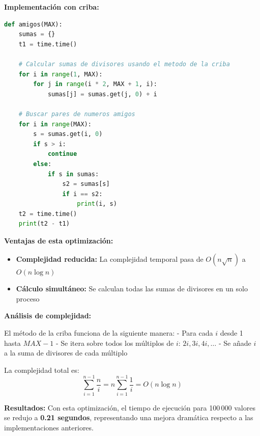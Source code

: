 \textbf{Implementación con criba:}

\begin{lstlisting}[language=Python]
def amigos(MAX):
    sumas = {}
    t1 = time.time()
    
    # Calcular sumas de divisores usando el metodo de la criba
    for i in range(1, MAX):
        for j in range(i * 2, MAX + 1, i):
            sumas[j] = sumas.get(j, 0) + i
    
    # Buscar pares de numeros amigos
    for i in range(MAX):
        s = sumas.get(i, 0)
        if s > i:
            continue
        else:
            if s in sumas:
                s2 = sumas[s]
                if i == s2:
                    print(i, s)       
    t2 = time.time()
    print(t2 - t1)
\end{lstlisting}

\textbf{Ventajas de esta optimización:}

\begin{itemize}
    \item \textbf{Complejidad reducida:} La complejidad temporal pasa de $O(n \sqrt{n})$ a $O(n \log n)$
    \item \textbf{Cálculo simultáneo:} Se calculan todas las sumas de divisores en un solo proceso
\end{itemize}

\textbf{Análisis de complejidad:}

El método de la criba funciona de la siguiente manera:
- Para cada $i$ desde 1 hasta $MAX-1$
- Se itera sobre todos los múltiplos de $i$: $2i, 3i, 4i, \ldots$
- Se añade $i$ a la suma de divisores de cada múltiplo

La complejidad total es:
$$\sum_{i=1}^{n-1} \frac{n}{i} = n \sum_{i=1}^{n-1} \frac{1}{i} = O(n \log n)$$

\textbf{Resultados:} Con esta optimización, el tiempo de ejecución para 100\,000 valores se redujo a \textbf{0.21 segundos}, representando una mejora dramática respecto a las implementaciones anteriores.

